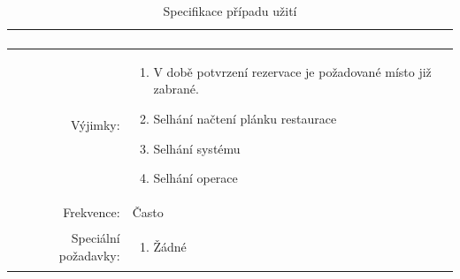 \begin{table}[ht!]
{\begin{tabular}{| r | p{12cm} |}
\begin{minipage}[t]{0.75\textwidth}
\begin{enumerate}[nosep,after=\strut]
    	\end{enumerate}
  	\end{minipage} \\
    \hline
    Výjimky: & 
    \begin{minipage}[t]{0.75\textwidth}
    	\begin{enumerate}[nosep,after=\strut]
    		\item V době potvrzení rezervace je požadované místo již zabrané.
            \item Selhání načtení plánku restaurace
            \item Selhání systému
            \item Selhání operace
    	\end{enumerate}
  	\end{minipage} \\
    \hline
    Frekvence: & Často \\
    \hline
    Speciální požadavky: & 
    \begin{minipage}[t]{0.75\textwidth}
    	\begin{enumerate}[nosep,after=\strut]
    		\item Žádné
    	\end{enumerate}
  	\end{minipage} \\
    \hline

\end{tabular}}
\caption{Specifikace případu užití }
\label{table:1}
\end{table}



